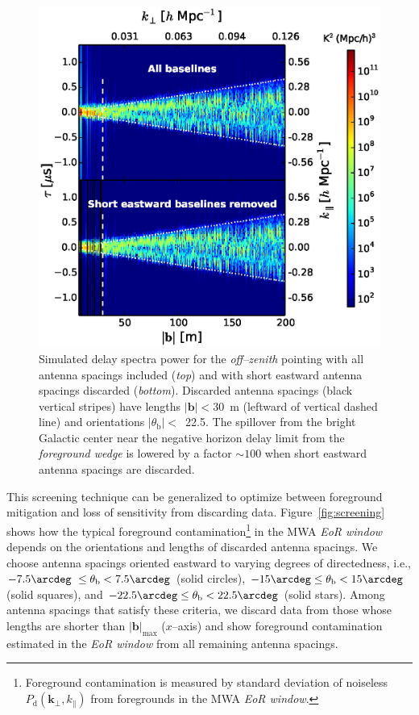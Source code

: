\documentclass[preprint2,iop,numberedappendix,twocolappendix,appendixfloats]{emulateapj}
\begin{document}
\begin{figure}[htb]
\centering
\includegraphics[width=\linewidth]{figure10.eps}
\caption{Simulated delay spectra power for the {\it off--zenith} pointing with all antenna spacings included ({\it top}) and with short eastward antenna spacings discarded ({\it bottom}). Discarded antenna spacings (black vertical stripes) have lengths $|\boldsymbol{b}|<30$~m (leftward of vertical dashed line) and orientations $|\theta_\textrm{b}|<$~22.5\arcdeg. The spillover from the bright Galactic center near the negative horizon delay limit from the {\it foreground wedge} is lowered by a factor $\sim 100$ when short eastward antenna spacings are discarded. \label{fig:before-after}}
\end{figure}

This screening technique can be generalized to optimize between foreground mitigation and loss of sensitivity from discarding data. Figure~\ref{fig:screening} shows how the typical foreground contamination\footnote{Foreground contamination is measured by standard deviation of noiseless $P_\textrm{d}(\boldsymbol{k}_\perp,k_\parallel)$ from foregrounds in the MWA {\it EoR window}.} in the MWA {\it EoR window} depends on the orientations and lengths of discarded antenna spacings. We choose antenna spacings oriented eastward to varying degrees of directedness, i.e., $-7.5\arcdeg~\le\theta_\textrm{b} < 7.5\arcdeg$ (solid circles), $-15\arcdeg\le\theta_\textrm{b}< 15\arcdeg$ (solid squares), and $-22.5\arcdeg\le\theta_\textrm{b}< 22.5\arcdeg$ (solid stars). Among antenna spacings that satisfy these criteria, we discard data from those whose lengths are shorter than $|\boldsymbol{b}|_\textrm{max}$ ($x$--axis) and show foreground contamination estimated in the {\it EoR window} from all remaining antenna spacings. 
\end{document}
